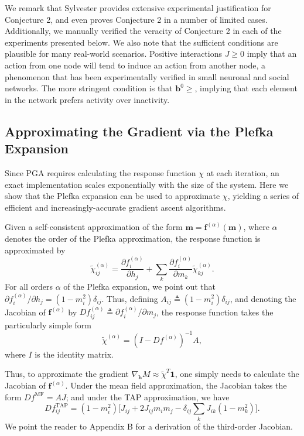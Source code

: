 \documentclass[letterpaper]{article} %
\begin{document}
We remark that Sylvester \cite{Sylvester-01} provides extensive experimental justification for Conjecture 2, and even proves Conjecture 2 in a number of limited cases. Additionally, we manually verified the veracity of Conjecture 2 in each of the experiments presented below. We also note that the sufficient conditions are plausible for many real-world scenarios. Positive interactions $J\ge 0$ imply that an action from one node will tend to induce an action from another node, a phenomenon that has been experimentally verified in small neuronal \cite{Schneidman-01} and social \cite{Lynn-03} networks. The more stringent condition is that $\bm{b}^0\ge$, implying that each element in the network prefers activity over inactivity.

\subsection{Approximating the Gradient via the Plefka Expansion}

Since PGA requires calculating the response function $\chi$ at each iteration, an exact implementation scales exponentially with the size of the system. Here we show that the Plefka expansion can be used to approximate $\chi$, yielding a series of efficient and increasingly-accurate gradient ascent algorithms.

Given a self-consistent approximation of the form $\bm{m} = \bm{f}^{(\alpha)}(\bm{m})$, where $\alpha$ denotes the order of the Plefka approximation, the response function is approximated by
\begin{equation}
\tilde{\chi}^{(\alpha)}_{ij} = \frac{\partial f^{(\alpha)}_i}{\partial h_j} + \sum_k \frac{\partial f^{(\alpha)}_i}{\partial m_k}\tilde{\chi}^{(\alpha)}_{kj}.
\end{equation}
For all orders $\alpha$ of the Plefka expansion, we point out that $\partial f^{(\alpha)}_i/\partial h_j = (1-m_i^2)\delta_{ij}$. Thus, defining $A_{ij} \triangleq (1-m_i^2)\delta_{ij}$, and denoting the Jacobian of $\bm{f}^{(\alpha)}$ by $Df^{(\alpha)}_{ij} \triangleq \partial f^{(\alpha)}_i/\partial m_j$, the response function takes the particularly simple form
\begin{equation}
\tilde{\chi}^{(\alpha)} = (I - Df^{(\alpha)})^{-1}A,
\end{equation}
where $I$ is the identity matrix. 

Thus, to approximate the gradient $\nabla_{\bm{h}} M \approx \tilde{\chi}^T\bm{1}$, one simply needs to calculate the Jacobian of $\bm{f}^{(\alpha)}$. Under the mean field approximation, the Jacobian takes the form $Df^{\text{MF}} = AJ$; and under the TAP approximation, we have
\begin{equation}
Df^{\text{TAP}}_{ij} = (1-m_i^2)\Big[J_{ij} + 2J_{ij}m_im_j - \delta_{ij}\sum_kJ_{ik}(1-m_k^2)\Big].
\end{equation}
We point the reader to Appendix B for a derivation of the third-order Jacobian.
\end{document}
